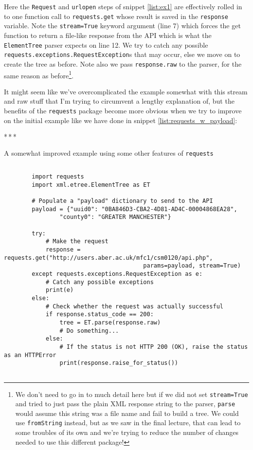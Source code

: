 \documentclass[a4paper]{article}
\newcommand{\asterism}{\bigskip\par\centerline{*\,*\,*}\medskip\par}%
\begin{document}
Here the \texttt{Request} and \texttt{urlopen} steps of snippet \ref{list:ex1} are
effectively rolled in to one function call to \texttt{requests.get} whose result
is saved in the \texttt{response} variable. Note the
\texttt{stream=True} keyword argument (line 7) which forces the get function to
return a file-like response from the API which is what the \texttt{ElementTree}
parser expects on line 12. We try to catch any possible \texttt{requests.exceptions.RequestException}s
that may occur, else we move on to create the tree as before. Note also we pass
\texttt{response.raw} to the parser, for the same reason as before\footnote{We don't need
to go in to much detail here but if we did not set \texttt{stream=True} and tried
to just pass the plain XML response string to the parser, \texttt{parse} would assume
this string was a file name and fail to build a tree. We could use \texttt{fromString} instead,
but as we saw in the final lecture, that can lead to some troubles of its own and
we're trying to reduce the number of changes needed to use this different package!}.

It might seem like we've overcomplicated the example somewhat with this stream
and raw stuff that I'm trying to circumvent a lengthy explanation of, but the benefits of
the \texttt{requests} package become more obvious when we try to improve
on the initial example like we have done in snippet \ref{list:requests_w_payload}:

\asterism
\pagebreak

\begin{listing}[H]
    \caption[]{A somewhat improved example using some other features of \texttt{requests}}
    \label{list:requests_w_payload}
    \begin{verbatim}

        import requests
        import xml.etree.ElementTree as ET

        # Populate a "payload" dictionary to send to the API
        payload = {"uuid0": "0BA846D3-CBA2-4D81-AD4C-00004868EA28",
                "county0": "GREATER MANCHESTER"}

        try:
            # Make the request
            response = requests.get("http://users.aber.ac.uk/mfc1/csm0120/api.php",
                                        params=payload, stream=True)
        except requests.exceptions.RequestException as e:
            # Catch any possible exceptions
            print(e)
        else:
            # Check whether the request was actually successful
            if response.status_code == 200:
                tree = ET.parse(response.raw)
                # Do something...
            else:
                # If the status is not HTTP 200 (OK), raise the status as an HTTPError
                print(response.raise_for_status())


    \end{verbatim}
\end{listing}
\end{document}
